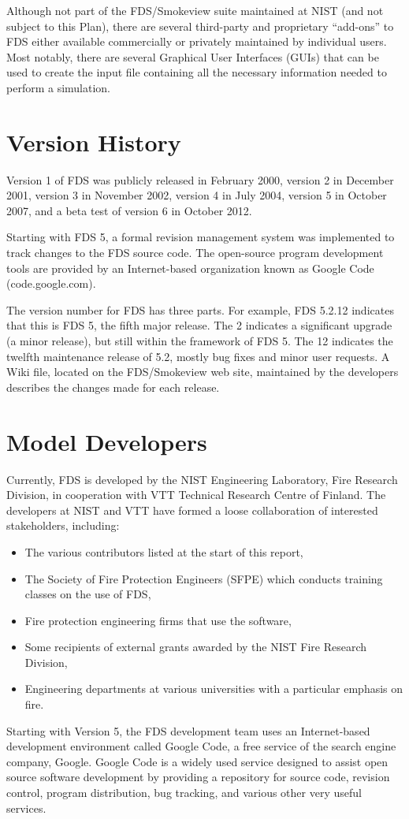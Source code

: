 \documentclass[11pt]{book}
\begin{document}
Although not part of the FDS/Smokeview suite maintained at NIST (and not subject to this Plan), there are several third-party and proprietary ``add-ons'' to FDS either available
commercially or privately maintained by individual users. Most notably, there are several Graphical User Interfaces (GUIs) that can be used to create
the input file containing all the necessary information needed to perform a simulation.



\section{Version History}

Version 1 of FDS was publicly released in February 2000, version 2 in December 2001, version 3 in November 2002, version 4 in July 2004, version 5 in October 2007, and a beta test of version 6 in October 2012.

Starting with FDS 5, a formal revision management system was implemented to track changes to the FDS source code. The open-source program
development tools are provided by an Internet-based organization known as Google Code (code.google.com).

The version number for FDS has three parts.  For example, FDS 5.2.12 indicates that this is FDS 5, the fifth major release. The 2 indicates a
significant upgrade (a minor release), but still within the framework of FDS 5.  The 12 indicates the twelfth maintenance release of 5.2, mostly bug fixes and minor user
requests.  A Wiki file, located on the FDS/Smokeview web site, maintained by the developers describes the changes made for each release.


\section{Model Developers}


Currently, FDS is developed by the NIST Engineering Laboratory, Fire Research Division, in cooperation with VTT Technical Research Centre of Finland.
The developers at NIST and VTT have formed a loose collaboration of interested stakeholders, including:
\begin{itemize}
\item The various contributors listed at the start of this report,
\item The Society of Fire Protection Engineers (SFPE) which conducts training classes on the use of FDS,
\item Fire protection engineering firms that use the software,
\item Some recipients of external grants awarded by the NIST Fire Research Division,
\item Engineering departments at various universities with a particular emphasis on fire.
\end{itemize}
Starting with Version 5, the FDS development team uses an Internet-based development environment called Google Code, a free service of the search
engine company, Google. Google Code is a widely used service designed to assist open source software development by providing a repository for source
code, revision control, program distribution, bug tracking, and various other very useful services.
\end{document}
